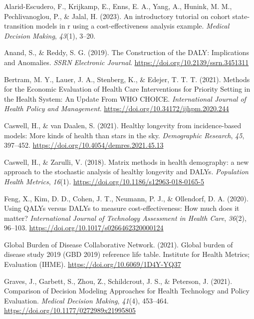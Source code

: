 \documentclass[
]{agujournal2019}
\newlength{\cslhangindent}
\newenvironment{CSLReferences}[2] %
 {\begin{list}{}{%
  \setlength{\itemindent}{0pt}
  \setlength{\leftmargin}{0pt}
  \setlength{\parsep}{0pt}
  \ifodd #1
   \setlength{\leftmargin}{\cslhangindent}
   \setlength{\itemindent}{-1\cslhangindent}
  \fi
  \setlength{\itemsep}{#2\baselineskip}}}
 {\end{list}}
\begin{document}
\label{refs}
\begin{CSLReferences}{1}{0}
\vspace{1em}

Alarid-Escudero, F., Krijkamp, E., Enns, E. A., Yang, A., Hunink, M. M.,
Pechlivanoglou, P., \& Jalal, H. (2023). An introductory tutorial on
cohort state-transition models in r using a cost-effectiveness analysis
example. \emph{Medical Decision Making}, \emph{43}(1), 3--20.

Anand, S., \& Reddy, S. G. (2019). The Construction of the DALY:
Implications and Anomalies. \emph{SSRN Electronic Journal}.
\url{https://doi.org/10.2139/ssrn.3451311}

Bertram, M. Y., Lauer, J. A., Stenberg, K., \& Edejer, T. T. T. (2021).
Methods for the Economic Evaluation of Health Care Interventions for
Priority Setting in the Health System: An Update From WHO CHOICE.
\emph{International Journal of Health Policy and Management}.
\url{https://doi.org/10.34172/ijhpm.2020.244}

Caswell, H., \& van Daalen, S. (2021). Healthy longevity from
incidence-based models: More kinds of health than stars in the sky.
\emph{Demographic Research}, \emph{45}, 397--452.
\url{https://doi.org/10.4054/demres.2021.45.13}

Caswell, H., \& Zarulli, V. (2018). Matrix methods in health demography:
a new approach to the stochastic analysis of healthy longevity and
DALYs. \emph{Population Health Metrics}, \emph{16}(1).
\url{https://doi.org/10.1186/s12963-018-0165-5}

Feng, X., Kim, D. D., Cohen, J. T., Neumann, P. J., \& Ollendorf, D. A.
(2020). Using QALYs versus DALYs to measure cost-effectiveness: How much
does it matter? \emph{International Journal of Technology Assessment in
Health Care}, \emph{36}(2), 96--103.
\url{https://doi.org/10.1017/s0266462320000124}

Global Burden of Disease Collaborative Network. (2021). Global burden of
disease study 2019 (GBD 2019) reference life table. Institute for Health
Metrics; Evaluation (IHME). \url{https://doi.org/10.6069/1D4Y-YQ37}

Graves, J., Garbett, S., Zhou, Z., Schildcrout, J. S., \& Peterson, J.
(2021). Comparison of Decision Modeling Approaches for Health Technology
and Policy Evaluation. \emph{Medical Decision Making}, \emph{41}(4),
453--464. \url{https://doi.org/10.1177/0272989x21995805}


\end{CSLReferences}
\end{document}
